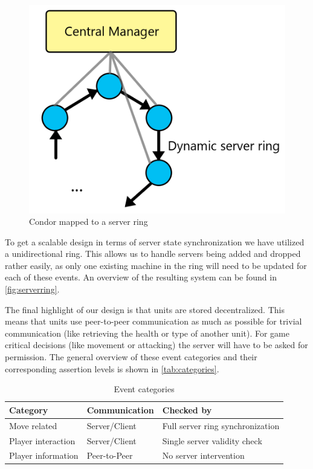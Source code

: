 \documentclass[a4paper,10pt]{article}
\begin{document}
\begin{figure}
\begin{framed}
    \begin{center}
        \includegraphics[width=\textwidth]{serverring.png}    
    \end{center}
    \caption{Condor mapped to a server ring}
    \label{fig:serverring}
\end{framed}
\end{figure}


To get a scalable design in terms of server state synchronization we have utilized a unidirectional ring.
This allows us to handle servers being added and dropped rather easily, as only one existing machine in the ring
will need to be updated for each of these events. An overview of the resulting system can be found in \autoref{fig:serverring}.

The final highlight of our design is that units are stored decentralized.
This means that units use peer-to-peer communication as much as possible for trivial communication (like retrieving the health or type of another unit).
For game critical decisions (like movement or attacking) the server will have to be asked for permission.
The general overview of these event categories and their corresponding assertion levels is shown in \autoref{tab:categories}.

\begin{table}
\begin{tabular}{| l | l | l |}
\hline
\textbf{Category} & \textbf{Communication} & \textbf{Checked by} \\
\hline
\hline
Move related & Server/Client & Full server ring synchronization \\
\hline
Player interaction & Server/Client & Single server validity check \\
\hline
Player information & Peer-to-Peer & No server intervention \\
\hline
\end{tabular}
\caption{Event categories}
\label{tab:categories}
\end{table}
\end{document}
